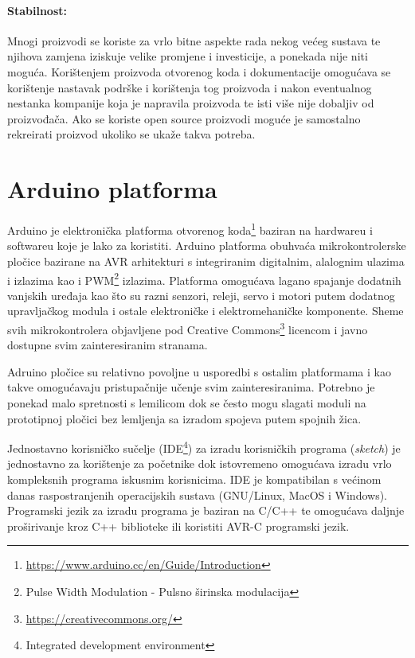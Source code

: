 \paragraph{Stabilnost:}
Mnogi proizvodi se koriste za vrlo bitne aspekte rada nekog većeg sustava te njihova zamjena iziskuje velike promjene i investicije, a ponekada nije niti moguća.
Korištenjem proizvoda otvorenog koda i dokumentacije omogućava se korištenje nastavak podrške i korištenja tog proizvoda i nakon eventualnog nestanka kompanije koja je napravila proizvoda te isti više nije dobaljiv od proizvođača. 
Ako se koriste open source proizvodi moguće je samostalno rekreirati proizvod ukoliko se ukaže takva potreba.


\section{Arduino platforma}
Arduino je elektronička platforma otvorenog koda\footnote{\href{https://www.arduino.cc/en/Guide/Introduction}{https://www.arduino.cc/en/Guide/Introduction}} baziran na hardwareu i softwareu koje je lako za koristiti.
Arduino platforma obuhvaća mikrokontrolerske pločice bazirane na AVR arhitekturi s integriranim digitalnim, alalognim ulazima i izlazima kao i PWM\footnote{Pulse Width Modulation - Pulsno širinska modulacija} izlazima.
Platforma omogućava lagano spajanje dodatnih vanjskih uređaja kao što su razni senzori, releji, servo i motori putem dodatnog upravljačkog modula i ostale elektroničke i elektromehaničke komponente.
Sheme svih mikrokontrolera objavljene pod Creative Commons\footnote{\href{https://creativecommons.org/}{https://creativecommons.org/}} licencom i javno dostupne svim zainteresiranim stranama.

Adruino pločice su relativno povoljne u usporedbi s ostalim platformama i kao takve omogućavaju pristupačnije učenje svim zainteresiranima.
Potrebno je ponekad malo spretnosti s lemilicom dok se često mogu slagati moduli na prototipnoj pločici bez lemljenja sa izradom spojeva putem spojnih žica.

Jednostavno korisničko sučelje (IDE\footnote{Integrated development environment}) za izradu korisničkih programa (\textit{sketch}) je jednostavno za korištenje za početnike dok istovremeno omogućava izradu vrlo kompleksnih programa iskusnim korisnicima. 
IDE je kompatibilan s većinom danas raspostranjenih operacijskih sustava (GNU/Linux, MacOS i Windows).
Programski jezik za izradu programa je baziran na C/C++ te omogućava daljnje proširivanje kroz C++ biblioteke ili koristiti AVR-C programski jezik.

